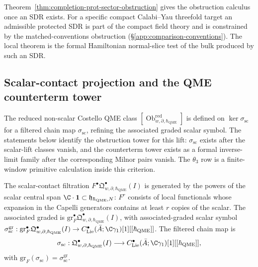 \begin{rmk}
\label{rmk:completion-protected-existence}
Theorem~\ref{thm:completion-prot-sector-obstruction} gives the
obstruction calculus once an SDR exists.  For a specific compact
Calabi--Yau threefold target an admissible protected SDR is part of the
compact field theory and is constrained by the matched-conventions
obstruction (\S\ref{app:comparison-conventions}).  The local theorem is the
formal Hamiltonian normal-slice test of the bulk produced by such an
SDR.
\end{rmk}

\subsection{Scalar-contact projection and the QME counterterm tower}
\label{ssec:completion-qme-tower}

The reduced non-scalar Costello QME class
\([\operatorname{Ob}^{\mathrm{red}}_{w,\partial,\hbar_{\mathrm{QME}}}]\) is defined
on \(\ker\sigma_{\mathrm{sc}}\) for a filtered chain map
\(\sigma_{\mathrm{sc}}\), refining the associated graded scalar
symbol.  The statements below identify the obstruction tower for this
lift: \(\sigma_{\mathrm{sc}}\) exists after the scalar-lift classes
vanish, and the counterterm tower exists as a formal inverse-limit
family after the corresponding Milnor pairs vanish.  The \(\theta_3\)
row is a finite-window primitive calculation inside this criterion.

\begin{defn}
\label{def:completion-scalar-contact}
The scalar-contact filtration
\(F^\bullet\mathfrak Q^\bullet_{w,\partial,\hbar_{\mathrm{QME}}}(I)\) is generated
by the powers of the scalar central span \(\C\cdot\mathbf 1\subset
\mathfrak h_{\hbar_{\mathrm{QME}},N}\): \(F^r\) consists of local functionals
whose expansion in the Capelli generators contains at least \(r\)
copies of the scalar.  The associated graded is
\(\mathrm{gr}^\bullet_F\mathfrak Q^\bullet_{w,\partial,\hbar_{\mathrm{QME}}}(I)\),
with associated-graded scalar symbol
\(\sigma_{\mathrm{sc}}^{\mathrm{gr}}:\mathrm{gr}^\bullet_F
\mathfrak Q^\bullet_{w,\partial,\hbar_{\mathrm{QME}}}(I)\to
C^\bullet_{\mathrm{Lie}}(\bar A;\C\gamma_1)[1][[\hbar_{\mathrm{QME}}]]\).  The
filtered chain map is
\[
  \sigma_{\mathrm{sc}}:\mathfrak Q^\bullet_{w,\partial,\hbar_{\mathrm{QME}}}(I)
   \longrightarrow C^\bullet_{\mathrm{Lie}}(\bar A;\C\gamma_1)[1][[\hbar_{\mathrm{QME}}]],
\]
with \(\mathrm{gr}_F(\sigma_{\mathrm{sc}})=\sigma_{\mathrm{sc}}^{\mathrm{gr}}\).
\end{defn}


